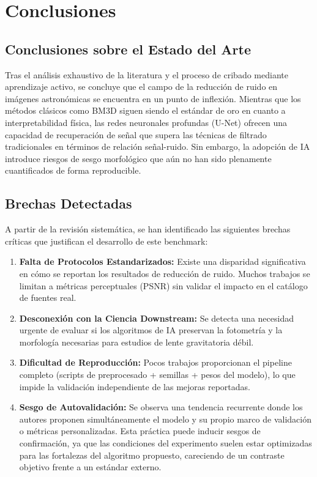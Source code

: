 \chapter{Conclusiones}

\section{Conclusiones sobre el Estado del Arte}

Tras el an\'alisis exhaustivo de la literatura y el proceso de cribado mediante aprendizaje activo, se concluye que el campo de la reducci\'on de ruido en im\'agenes astron\'omicas se encuentra en un punto de inflexi\'on. Mientras que los m\'etodos cl\'asicos como BM3D siguen siendo el est\'andar de oro en cuanto a interpretabilidad f\'isica, las redes neuronales profundas (U-Net) ofrecen una capacidad de recuperaci\'on de señal que supera las t\'ecnicas de filtrado tradicionales en t\'erminos de relaci\'on señal-ruido. Sin embargo, la adopci\'on de IA introduce riesgos de sesgo morfol\'ogico que a\'un no han sido plenamente cuantificados de forma reproducible.

\section{Brechas Detectadas}

A partir de la revisi\'on sistem\'atica, se han identificado las siguientes brechas cr\'iticas que justifican el desarrollo de este benchmark:

\begin{enumerate}
    \item \textbf{Falta de Protocolos Estandarizados:} Existe una disparidad significativa en c\'omo se reportan los resultados de reducci\'on de ruido. Muchos trabajos se limitan a m\'etricas perceptuales (PSNR) sin validar el impacto en el catálogo de fuentes real.
    \item \textbf{Desconexi\'on con la Ciencia Downstream:} Se detecta una necesidad urgente de evaluar si los algoritmos de IA preservan la fotometr\'ia y la morfolog\'ia necesarias para estudios de lente gravitatoria d\'ebil.
    \item \textbf{Dificultad de Reproducci\'on:} Pocos trabajos proporcionan el pipeline completo (scripts de preprocesado + semillas + pesos del modelo), lo que impide la validaci\'on independiente de las mejoras reportadas.
    \item \textbf{Sesgo de Autovalidaci\'on:} Se observa una tendencia recurrente donde los autores proponen simult\'aneamente el modelo y su propio marco de validaci\'on o métricas personalizadas. Esta pr\'actica puede inducir sesgos de confirmaci\'on, ya que las condiciones del experimento suelen estar optimizadas para las fortalezas del algoritmo propuesto, careciendo de un contraste objetivo frente a un estándar externo.
\end{enumerate}
